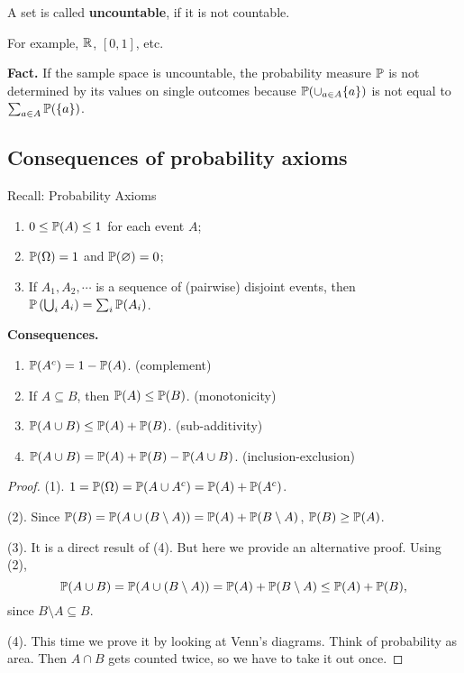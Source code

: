  \begin{definition}
   A set is called \textbf{uncountable}, if it is not countable. 
 \end{definition}
 For example, $\mathbb{R}$, $[0,1]$, etc.

 \textbf{Fact.} If the sample space is uncountable, the probability measure
 $\mathbb{P}$ is not determined by its values on single outcomes because
 $\mathbb{P}(\cup_{a\in A} \{a\})$ is not equal to $\sum_{a\in A} \mathbb{P}(\{a\})$.

 
  \subsection{Consequences of probability axioms}
  \label{subsec:1.4}
  Recall: Probability Axioms
  \begin{enumerate}
  \item $0\le \mathbb{P}(A)\le 1$ for each event $A$;
  \item $\mathbb{P}(\Omega) = 1$ and $\mathbb{P}(\varnothing) =0$;
  \item If $A_1, A_2, \cdots$ is a sequence of (pairwise) disjoint events, then $  \mathbb{P}\left( \bigcup_i A_i \right) = \sum_i \mathbb{P}(A_i)$.
  \end{enumerate}
  \textbf{Consequences.}
  \begin{enumerate}[(1)]
  \item $\mathbb{P}(A^c) = 1- \mathbb{P}(A)$. (complement)
  \item If $A\subseteq B$, then $\mathbb{P}(A) \le \mathbb{P}(B)$. (monotonicity)
  \item $\mathbb{P}(A\cup B) \le \mathbb{P}(A) + \mathbb{P}(B)$. (sub-additivity)
  \item $\mathbb{P}(A\cup B) = \mathbb{P}(A) + \mathbb{P}(B) - \mathbb{P}(A\cup B)$. (inclusion-exclusion)
  \end{enumerate}
  \begin{proof}
    (1). $1 = \mathbb{P}(\Omega) = \mathbb{P}(A\cup A^c) = \mathbb{P}(A) + \mathbb{P}(A^c)$.

    (2). Since $\mathbb{P}(B) = \mathbb{P}(A\cup (B\setminus A)) = \mathbb{P}(A) + \mathbb{P}(B\setminus
    A)$, $\mathbb{P}(B) \ge \mathbb{P}(A)$.

    (3). It is a direct result of (4). But here we provide an alternative proof.
    Using (2),
    \[
      \mathbb{P}(A\cup B) = \mathbb{P}(A\cup (B\setminus A)) = \mathbb{P}(A) + \mathbb{P}(B\setminus A) \le
      \mathbb{P}(A) + \mathbb{P}(B),
    \]
    since $B\setminus A\subseteq B$. 

    (4). This time we prove it by looking at Venn's diagrams. Think of
    probability as area. Then $A \cap B$ gets counted twice, so we have to take
    it out once.
  \end{proof}
